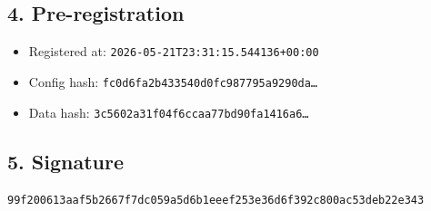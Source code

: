 \documentclass{article}
\begin{document}
\subsection*{4. Pre-registration}
\begin{itemize}
\item Registered at: \texttt{2026-05-21T23:31:15.544136+00:00}
\item Config hash: \texttt{fc0d6fa2b433540d0fc987795a9290da\dots}
\item Data hash: \texttt{3c5602a31f04f6ccaa77bd90fa1416a6\dots}
\end{itemize}
\subsection*{5. Signature}
\texttt{99f200613aaf5b2667f7dc059a5d6b1eeef253e36d6f392c800ac53deb22e343}\\
\end{document}
